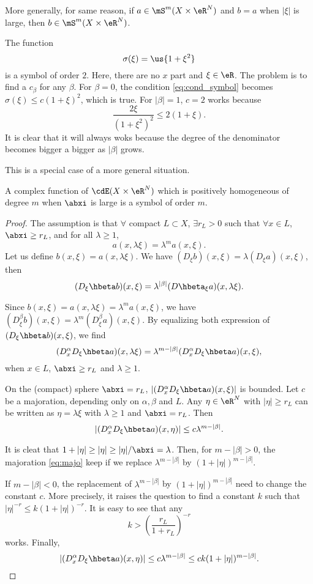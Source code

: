 More generally, for same reason, if $a\in\mS^m(X\times\eR^N)$ and $b=a$ when $|\xi|$ is large, then $b\in\mS^m(X\times\eR^N)$.

The function
\[
	\sigma(\xi)=\us{1+\xi^2}
\]
is a symbol of order $2$. Here, there are no $x$ part and $\xi\in\eR$. The problem is to find a $c_{\beta}$ for any $\beta$. For $\beta=0$, the condition \eqref{eq:cond_symbol} becomes $\sigma(\xi)\leq c(1+\xi)^2$, which is true. For $|\beta|=1$, $c=2$ works because
\[
	\frac{2\xi}{(1+\xi^2)^2}\leq 2(1+\xi).
\]
It is clear that it will always woks because the degree of the denominator becomes bigger a bigger as $|\beta|$ grows.

This is a special case of a more general situation.

\begin{proposition}
	A complex function of $\cdE(X\times\eR^N)$ which is positively homogeneous of
	degree $m$ when $\abxi$ is large is a symbol of order $m$.
\end{proposition}\label{prop:23.16.4}
\begin{proof}
	The assumption is that $\forall$ compact $L\subset X$, $\exists r_L>0$ such that $\forall x\in L$, $\abxi\geq r_L$, and for all $\lambda\geq 1$,
	\[
		a(x,\lambda\xi)=\lambda^m a(x,\xi).
	\]
	Let us define $b(x,\xi)=a(x,\lambda\xi)$. We have $(D_{\xi} b)(x,\xi)=\lambda(D_{\xi} a)(x,\xi)$, then
	\[
		(D_{\xi}\hbeta b)(x,\xi)=\lambda^{|\beta|}(D\hbeta_{\xi} a)(x,\lambda\xi).
	\]

	Since $b(x,\xi)=a(x,\lambda\xi)=\lambda^ma(x,\xi)$, we have $(D^{\beta}_{\xi}b)(x,\xi)=\lambda^m(D_{\xi}^{\beta}a)(x,\xi)$. By equalizing both expression of $(D_{\xi}\hbeta b)(x,\xi)$, we find
	\[
		(D_x^{\alpha} D_{\xi}\hbeta a)(x,\lambda\xi)=\lambda^{m-|\beta|}(D_x^{\alpha} D_{\xi}\hbeta a)(x,\xi),
	\]
	when $x\in L$, $\abxi\geq r_L$ and $\lambda\geq 1$.

	On the (compact) sphere $\abxi=r_L$, $|(D_x^{\alpha} D_{\xi}\hbeta a)(x,\xi)|$ is bounded. Let $c$ be a majoration, depending only on $\alpha,\beta$ and $L$. Any $\eta\in\eR^N$ with $|\eta|\geq r_L$ can be written as $\eta=\lambda\xi$ with $\lambda\geq 1$ and $\abxi=r_L$. Then
	\begin{equation}\label{eq:majo}
		|(D_x^{\alpha} D_{\xi}\hbeta a)(x,\eta)|\leq c\lambda^{m-|\beta|}.
	\end{equation}

	It is cleat that $1+|\eta|\geq|\eta|\geq|\eta|/\abxi=\lambda$. Then, for $m-|\beta|>0$, the majoration \eqref{eq:majo} keep if we replace $\lambda^{m-|\beta|}$ by  $(1+|\eta|)^{m-|\beta|}$.

	If $m-|\beta|<0$, the replacement of $\lambda^{m-|\beta|}$ by  $(1+|\eta|)^{m-|\beta|}$ need to change the constant $c$. More precisely, it raises the question to find a constant $k$ such that $|\eta|^{-r}\leq k(1+|\eta|)^{-r}$. It is easy to see that any
	\[
		k>\left(\frac{r_L}{1+r_L}\right)^{-r}
	\]
	works. Finally,
	\begin{equation}
		|(D_x^{\alpha} D_{\xi}\hbeta a)(x,\eta)|\leq c\lambda^{m-|\beta|}
		\leq ck(1+|\eta|)^{m-|\beta|}.
	\end{equation}
\end{proof}

